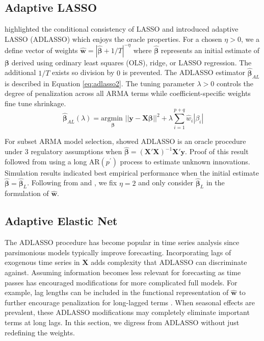 \subsection{Adaptive LASSO}

\cite{Zou2006} highlighted the conditional consistency of LASSO and introduced adaptive LASSO (ADLASSO) which enjoys the oracle properties. For a chosen $\eta>0$, we a define vector of weights $\hat{\bm{w}}=|\hat{\bm{\beta}}+1/T|^{-\eta}$ where $\hat{\bm{\beta}}$ represents an initial estimate of $\bm{\beta}$ derived using ordinary least squares (OLS), ridge, or LASSO regression. The additional $1/T$ exists so division by $0$ is prevented. The ADLASSO estimator $\hat{\bm{\beta}}_{AL}$ is described in Equation \ref{eq:adlasso2}. The tuning parameter $\lambda>0$ controls the degree of penalization across all ARMA terms while coefficient-specific weights fine tune shrinkage.
\begin{equation}
\label{eq:adlasso2}
\hat{\bm{\beta}}_{AL} (\lambda)= \underset{\bm{\beta}}{\textrm{argmin }}  ||\bm{y}-\bm{X}\bm{\beta}||^2 + \lambda \sum\limits_{i=1}^{p+q} \hat{w}_{i}|\beta_i|
\end{equation}

For subset ARMA model selection, \cite{Chen2011} showed ADLASSO is an oracle procedure under 3 regulatory assumptions when $\hat{\bm{\beta}}=(\bm{X}'\bm{X})^{-1}\bm{X}'\bm{y}$. Proof of this result followed from using a long AR$(p^\prime)$ process to estimate unknown innovations. Simulation results indicated best empirical performance when the initial estimate $\hat{\bm{\beta}}=\hat{\bm{\beta}}_L$. Following from \cite{Zou2006} and \cite{Chen2011}, we fix $\eta=2$ and only consider $\hat{\bm{\beta}}_L$ in the formulation of $\hat{\bm{w}}$.

\subsection{Adaptive Elastic Net}
The ADLASSO procedure has become popular in time series analysis since parsimonious models typically improve forecasting. Incorporating lags of exogenous time series in $\bm{X}$ adds complexity that ADLASSO can discriminate against. Assuming information becomes less relevant for forecasting as time passes has encouraged modifications for more complicated full models. For example, lag lengths can be included in the functional representation of $\hat{\bm{w}}$ to further encourage penalization for long-lagged terms \citep{Park2013,Konzen2016}. When seasonal effects are prevalent, these ADLASSO modifications may completely eliminate important terms at long lags. In this section, we digress from ADLASSO without just redefining the weights.

